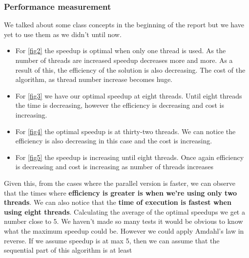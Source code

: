 \documentclass[10pt,journal,compsoc]{IEEEtran}
\begin{document}
\subsubsection{Performance measurement}
We talked about some class concepts in the beginning of the report but we have yet to use them as we didn't until now.
\begin{itemize}
    \item For \ref{fig2} the speedup is optimal when only one thread is used. As the number of threads are increased speedup decreases more and more. As a result of this, the efficiency of the solution is also decreasing. The cost of the algorithm, as thread number increase becomes huge.
    \item For \ref{fig3} we have our optimal speedup at eight threads. Until eight threads the time is decreasing, however the efficiency is decreasing and cost is increasing.
    \item For \ref{fig4} the optimal speedup is at thirty-two threads. We can notice the efficiency is also decreasing in this case and the cost is increasing.
    \item For \ref{fig5} the speedup is increasing until eight threads. Once again efficiency is decreasing and cost is increasing as number of threads increases
\end{itemize}

Given this, from the cases where the parallel version is faster, we can observe that the times where \textbf{efficiency is greater is when we're using only two threads}. We can also notice that the \textbf{time of execution is fastest when using eight threads}. Calculating the average of the optimal speedups we get a number close to 5. We haven't made so many tests it would be obvious to know what the maximum speedup could be. However we could apply Amdahl's law in reverse. If we assume speedup is at max 5, then we can assume that the sequential part of this algorithm is at least 
\end{document}
